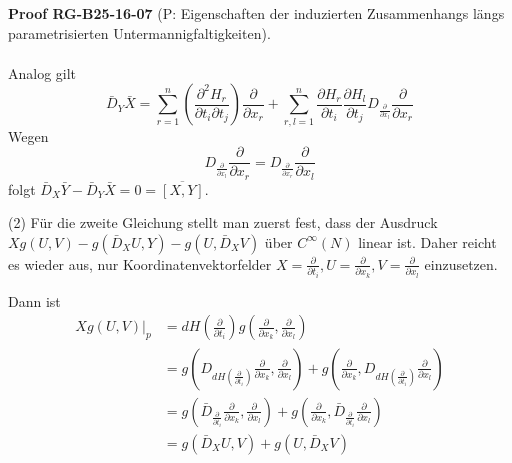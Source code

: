 \documentclass[10pt, letterpaper]{article}
\newcommand{\CustomHeading}[3]{%
  \par\medskip\noindent%
  \textbf{#1 #2} \textnormal{(#3)}.\enskip%
}
\newenvironment{PROOF}[2]{\begin{unitbox}\CustomHeading{Proof}{#1}{#2}}{\end{unitbox}}
\begin{document}
\begin{PROOF}{RG-B25-16-07}{P: Eigenschaften der induzierten Zusammenhangs längs parametrisierten Untermannigfaltigkeiten}
$$\begin{aligned}
\end{aligned}
$$
Analog gilt
$$
\bar{D}_{Y} \bar{X}=\sum_{r=1}^{n}\left(\frac{\partial^{2} H_{r}}{\partial t_{i} \partial t_{j}}\right) \frac{\partial}{\partial x_{r}}+\sum_{r, l=1}^{n} \frac{\partial H_{r}}{\partial t_{i}} \frac{\partial H_{l}}{\partial t_{j}} D_{\frac{\partial}{\partial x_{l}}} \frac{\partial}{\partial x_{r}}
$$
Wegen 
$$D_{\frac{\partial}{\partial x_{l}}} \frac{\partial}{\partial x_{r}}=D_{\frac{\partial}{\partial x_{r}}} \frac{\partial}{\partial x_{l}}$$ 
folgt $\bar{D}_{X} \bar{Y}-\bar{D}_{Y} \bar{X}=0=\overline{[X, Y]}$.


(2) Für die zweite Gleichung stellt man zuerst fest, dass der Ausdruck $X g(U, V)-g\left(\bar{D}_{X} U, Y\right)-g\left(U, \bar{D}_{X} V\right)$ über $C^{\infty}(N)$ linear ist. Daher reicht es wieder aus, nur Koordinatenvektorfelder $X=\frac{\partial}{\partial t_{i}}, U=\frac{\partial}{\partial x_{k}}, V=\frac{\partial}{\partial x_{l}}$ einzusetzen.

Dann ist
$$
\begin{aligned}
\left.X g(U, V)\right|_{p} & =d H\left(\frac{\partial}{\partial t_{i}}\right) g\left(\frac{\partial}{\partial x_{k}}, \frac{\partial}{\partial x_{l}}\right) \\
& =g\left(D_{d H\left(\frac{\partial}{\partial t_{i}}\right)} \frac{\partial}{\partial x_{k}}, \frac{\partial}{\partial x_{l}}\right)+g\left(\frac{\partial}{\partial x_{k}}, D_{d H\left(\frac{\partial}{\partial t_{i}}\right)} \frac{\partial}{\partial x_{l}}\right) \\
& =g\left(\bar{D}_{\frac{\partial}{\partial t_{i}}} \frac{\partial}{\partial x_{k}}, \frac{\partial}{\partial x_{l}}\right)+g\left(\frac{\partial}{\partial x_{k}}, \bar{D}_{\frac{\partial}{\partial t_{i}}} \frac{\partial}{\partial x_{l}}\right) \\
& =g\left(\bar{D}_{X} U, V\right)+g\left(U, \bar{D}_{X} V\right)
\end{aligned}
$$



\end{PROOF}
\end{document}
